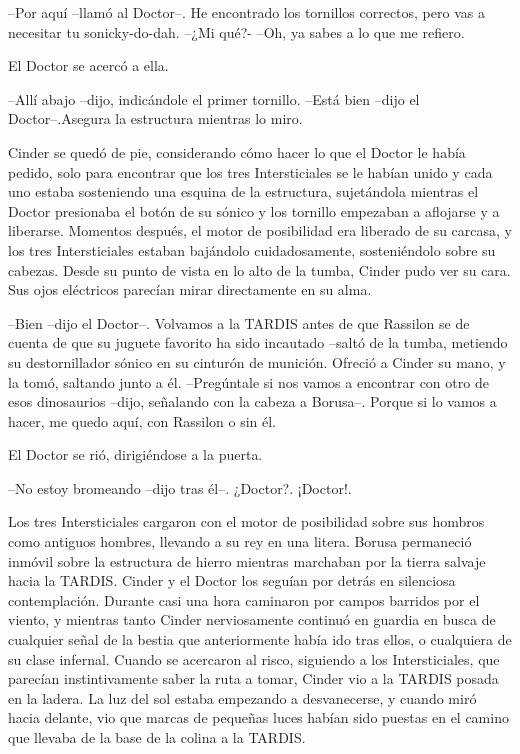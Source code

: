 --Por aquí --llamó al Doctor--. He encontrado los tornillos correctos, pero vas a necesitar tu sonicky-do-dah.
--¿Mi qué?-
--Oh, ya sabes a lo que me refiero.

El Doctor se acercó a ella. 

--Allí abajo --dijo, indicándole el primer tornillo.
--Está bien --dijo el Doctor--.Asegura la estructura mientras lo miro.

Cinder se quedó de pie, considerando cómo hacer lo que el Doctor le había pedido, solo para encontrar que los tres Intersticiales se le habían unido y cada uno estaba sosteniendo una esquina de la estructura, sujetándola mientras el Doctor presionaba el botón de su sónico y los tornillo empezaban a aflojarse y a liberarse.
Momentos después, el motor de posibilidad era liberado de su carcasa, y los tres Intersticiales estaban bajándolo cuidadosamente, sosteniéndolo sobre su cabezas. Desde su punto de vista en lo alto de la tumba, Cinder pudo ver su cara. Sus ojos eléctricos parecían mirar directamente en su alma.

--Bien --dijo el Doctor--. Volvamos a la TARDIS antes de que Rassilon se de cuenta de que su juguete favorito ha sido incautado --saltó de la tumba, metiendo su destornillador sónico en su cinturón de munición. Ofreció a Cinder su mano, y la tomó, saltando junto a él.
--Pregúntale si nos vamos a encontrar con otro de esos dinosaurios --dijo, señalando con la cabeza a Borusa--. Porque si lo vamos a hacer, me quedo aquí, con Rassilon o sin él.

El Doctor se rió, dirigiéndose a la puerta.

--No estoy bromeando --dijo tras él--. ¿Doctor?. ¡Doctor!.

Los tres Intersticiales cargaron con el motor de posibilidad sobre sus hombros como antiguos hombres, llevando a su rey en una litera. Borusa permaneció inmóvil sobre la estructura de hierro mientras marchaban por la tierra salvaje hacia la TARDIS. Cinder y el Doctor los seguían por detrás en silenciosa contemplación.
Durante casi una hora caminaron por campos barridos por el viento, y mientras tanto Cinder nerviosamente continuó en guardia en busca de cualquier señal de la bestia que anteriormente había ido tras ellos, o cualquiera de su clase infernal.
Cuando se acercaron al risco, siguiendo a los Intersticiales, que parecían instintivamente saber la ruta a tomar, Cinder vio a la TARDIS posada en la ladera. La luz del sol estaba empezando a desvanecerse, y cuando miró hacia delante, vio que marcas de pequeñas luces habían sido puestas en el camino que llevaba de la base de la colina a la TARDIS.

